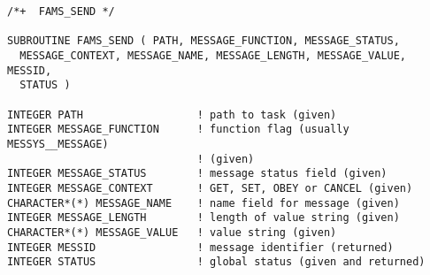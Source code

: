 \begin{verbatim}
/*+  FAMS_SEND */

SUBROUTINE FAMS_SEND ( PATH, MESSAGE_FUNCTION, MESSAGE_STATUS,
  MESSAGE_CONTEXT, MESSAGE_NAME, MESSAGE_LENGTH, MESSAGE_VALUE, MESSID,
  STATUS )

INTEGER PATH                  ! path to task (given)
INTEGER MESSAGE_FUNCTION      ! function flag (usually MESSYS__MESSAGE)
                              ! (given)
INTEGER MESSAGE_STATUS        ! message status field (given)
INTEGER MESSAGE_CONTEXT       ! GET, SET, OBEY or CANCEL (given)
CHARACTER*(*) MESSAGE_NAME    ! name field for message (given)
INTEGER MESSAGE_LENGTH        ! length of value string (given)
CHARACTER*(*) MESSAGE_VALUE   ! value string (given)
INTEGER MESSID                ! message identifier (returned)
INTEGER STATUS                ! global status (given and returned)

\end{verbatim}


